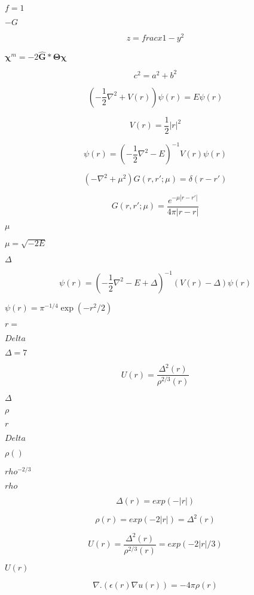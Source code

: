 \documentclass{article}
\begin{document}
$ f = 1 $
\pagebreak

$-G$
\pagebreak

\[ z = frac{x}{1 - y^2} \]
\pagebreak

$\boldsymbol{\chi}^m=-2 \boldsymbol{\hat{G}} * \boldsymbol{\Theta}\boldsymbol{\chi}$
\pagebreak

\[ c^2 = a^2 + b^2 \]
\pagebreak

\[ \left( -\frac{1}{2} \nabla^2 + V(r) \right) \psi(r) = E \psi(r) \]
\pagebreak

\[ V(r) = \frac{1}{2} |r|^2 \]
\pagebreak

\[ \psi(r) = \left( -\frac{1}{2} \nabla^2 - E \right)^{-1} V(r) \psi(r) \]
\pagebreak

\[ \left(-\nabla^2 + \mu^2 \right) G(r,r'; \mu) = \delta(r-r') \]
\pagebreak

\[ G(r,r'; \mu) = \frac{e^{-\mu |r-r'|}}{4 \pi |r-r|} \]
\pagebreak

$\mu$
\pagebreak

$\mu = \sqrt{-2 E}$
\pagebreak

$\Delta$
\pagebreak

\[ \psi(r) = \left( -\frac{1}{2} \nabla^2 - E + \Delta \right)^{-1} \left( V(r) -\Delta\right) \psi(r) \]
\pagebreak

$\psi(r)=\pi^{-1/4}\exp(-r^2 / 2)$
\pagebreak

$r=$
\pagebreak

$Delta$
\pagebreak

$\Delta=7$
\pagebreak

\[ U(r) = \frac{\Delta^2 (r)}{\rho^{2/3} (r)} \]
\pagebreak

$ \Delta $
\pagebreak

$ \rho $
\pagebreak

$ r $
\pagebreak

$ Delta $
\pagebreak

$ \rho() $
\pagebreak

$ rho^{-2/3} $
\pagebreak

$ rho $
\pagebreak

\[ \Delta(r) = exp(- | r | ) \]
\pagebreak

\[ \rho(r) = exp(- 2 | r | ) = \Delta^2(r) \]
\pagebreak

\[ U(r) = \frac{\Delta^2 (r)}{\rho^{2/3} (r)} = exp( - 2 | r | / 3) \]
\pagebreak

$ U(r) $
\pagebreak

\[ \nabla . \left( \epsilon(r) \nabla u(r) \right) = - 4 \pi \rho(r) \]
\pagebreak
\end{document}
